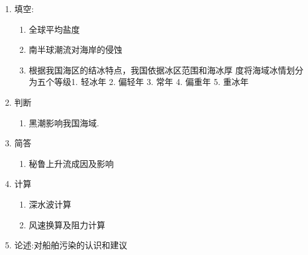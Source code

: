 \begin{enumerate}
\item 填空:
\begin{enumerate}
	\item 全球平均盐度
	\item 南半球潮流对海岸的侵蚀
	\item 根据我国海区的结冰特点，我国依据冰区范围和海冰厚
	度将海域冰情划分为五个等级1. 轻冰年
	2. 偏轻年
	3. 常年
	4. 偏重年
	5. 重冰年
\end{enumerate}


\item 判断
	\begin{enumerate}

		\item 黑潮影响我国海域.
	\end{enumerate}

\item 简答
	\begin{enumerate}
 
		\item 秘鲁上升流成因及影响
	\end{enumerate}

\item 计算
	\begin{enumerate}
		\item 深水波计算
		\item 风速换算及阻力计算
	\end{enumerate}

\item 论述:对船舶污染的认识和建议
\end{enumerate}